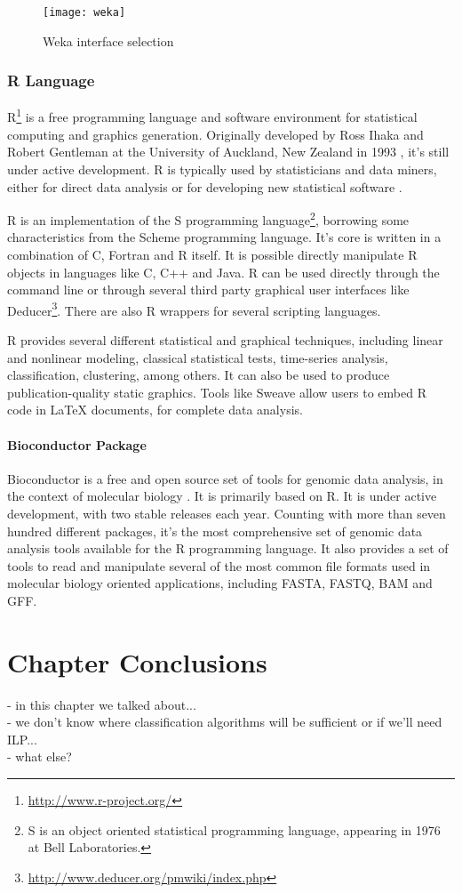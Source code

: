 \begin{figure}[!htb]
  \begin{center}
    \leavevmode
    \texttt{[image: weka]}
    \caption{Weka interface selection}
    \label{fig:weka}
  \end{center}
\end{figure}

\subsubsection*{R Language}

R\footnote{\url{http://www.r-project.org/}} is a free programming language and
software environment for statistical computing and graphics generation.
Originally developed by Ross Ihaka and Robert Gentleman at the University of
Auckland, New Zealand in 1993 \cite{Ihaka1998}, it's still under active
development. R is typically used by statisticians and data miners, either for
direct data analysis or for developing new statistical software \cite{Fox2005}.

R is an implementation of the S programming language\footnote{S is an object
oriented statistical programming language, appearing in 1976 at Bell
Laboratories.}, borrowing some characteristics from the Scheme programming
language. It's core is written in a combination of C, Fortran and R itself. It
is possible directly manipulate R objects in languages like C, C++ and Java. R
can be used directly through the command line or through several third party
graphical user interfaces like
Deducer\footnote{\url{http://www.deducer.org/pmwiki/index.php}}. There are also
R wrappers for several scripting languages.

R provides several different statistical and graphical techniques, including
linear and nonlinear modeling, classical statistical tests, time-series
analysis, classification, clustering, among others. It can also be used to
produce publication-quality static graphics. Tools like Sweave
\cite{lmucs-papers:Leisch:2002} allow users to embed R code in \LaTeX{}
documents, for complete data analysis.

\paragraph{Bioconductor Package}

Bioconductor is a free and open source set of tools for genomic data analysis,
in the context of molecular biology \cite{lmucs-papers:Leisch:2002}. It is
primarily based on R. It is under active development, with two stable releases
each year. Counting with more than seven hundred different packages, it's the
most comprehensive set of genomic data analysis tools available for the R
programming language. It also provides a set of tools to read and manipulate
several of the most common file formats used in molecular biology oriented
applications, including FASTA, FASTQ, BAM and GFF.

\section{Chapter Conclusions}

- in this chapter we talked about...\\
- we don't know where classification algorithms will be sufficient or if we'll
  need ILP...\\
- what else?\\
